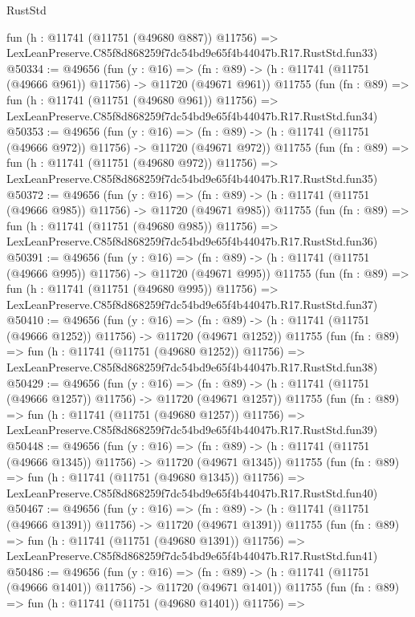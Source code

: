\begin{lexlean}{RustStd}
\begin{coremodule}
    fun (h : @11741 (@11751 (@49680 @887)) @11756) =>
    LexLeanPreserve.C85f8d868259f7dc54bd9e65f4b44047b.R17.RustStd.fun33)
@50334 := @49656
    (fun (y : @16) =>
    (fn : @89) -> (h : @11741 (@11751 (@49666 @961)) @11756) -> @11720 (@49671 @961))
    @11755
    (fun (fn : @89) =>
    fun (h : @11741 (@11751 (@49680 @961)) @11756) =>
    LexLeanPreserve.C85f8d868259f7dc54bd9e65f4b44047b.R17.RustStd.fun34)
@50353 := @49656
    (fun (y : @16) =>
    (fn : @89) -> (h : @11741 (@11751 (@49666 @972)) @11756) -> @11720 (@49671 @972))
    @11755
    (fun (fn : @89) =>
    fun (h : @11741 (@11751 (@49680 @972)) @11756) =>
    LexLeanPreserve.C85f8d868259f7dc54bd9e65f4b44047b.R17.RustStd.fun35)
@50372 := @49656
    (fun (y : @16) =>
    (fn : @89) -> (h : @11741 (@11751 (@49666 @985)) @11756) -> @11720 (@49671 @985))
    @11755
    (fun (fn : @89) =>
    fun (h : @11741 (@11751 (@49680 @985)) @11756) =>
    LexLeanPreserve.C85f8d868259f7dc54bd9e65f4b44047b.R17.RustStd.fun36)
@50391 := @49656
    (fun (y : @16) =>
    (fn : @89) -> (h : @11741 (@11751 (@49666 @995)) @11756) -> @11720 (@49671 @995))
    @11755
    (fun (fn : @89) =>
    fun (h : @11741 (@11751 (@49680 @995)) @11756) =>
    LexLeanPreserve.C85f8d868259f7dc54bd9e65f4b44047b.R17.RustStd.fun37)
@50410 := @49656
    (fun (y : @16) =>
    (fn : @89) -> (h : @11741 (@11751 (@49666 @1252)) @11756) -> @11720 (@49671 @1252))
    @11755
    (fun (fn : @89) =>
    fun (h : @11741 (@11751 (@49680 @1252)) @11756) =>
    LexLeanPreserve.C85f8d868259f7dc54bd9e65f4b44047b.R17.RustStd.fun38)
@50429 := @49656
    (fun (y : @16) =>
    (fn : @89) -> (h : @11741 (@11751 (@49666 @1257)) @11756) -> @11720 (@49671 @1257))
    @11755
    (fun (fn : @89) =>
    fun (h : @11741 (@11751 (@49680 @1257)) @11756) =>
    LexLeanPreserve.C85f8d868259f7dc54bd9e65f4b44047b.R17.RustStd.fun39)
@50448 := @49656
    (fun (y : @16) =>
    (fn : @89) -> (h : @11741 (@11751 (@49666 @1345)) @11756) -> @11720 (@49671 @1345))
    @11755
    (fun (fn : @89) =>
    fun (h : @11741 (@11751 (@49680 @1345)) @11756) =>
    LexLeanPreserve.C85f8d868259f7dc54bd9e65f4b44047b.R17.RustStd.fun40)
@50467 := @49656
    (fun (y : @16) =>
    (fn : @89) -> (h : @11741 (@11751 (@49666 @1391)) @11756) -> @11720 (@49671 @1391))
    @11755
    (fun (fn : @89) =>
    fun (h : @11741 (@11751 (@49680 @1391)) @11756) =>
    LexLeanPreserve.C85f8d868259f7dc54bd9e65f4b44047b.R17.RustStd.fun41)
@50486 := @49656
    (fun (y : @16) =>
    (fn : @89) -> (h : @11741 (@11751 (@49666 @1401)) @11756) -> @11720 (@49671 @1401))
    @11755
    (fun (fn : @89) =>
    fun (h : @11741 (@11751 (@49680 @1401)) @11756) =>

\end{coremodule}
\end{lexlean}
